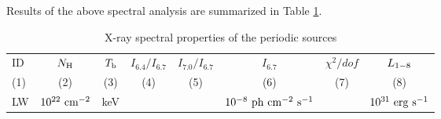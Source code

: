 \documentclass[fleqn,usenatbib]{mnras}
\begin{document}
Results of the above spectral analysis are summarized in Table \ref{tab:spec}.
\begin{table}
\centering
\begin{threeparttable}
\caption{X-ray spectral properties of the periodic sources \label{tab:spec}}
\begin{spacing}{1.19}

\begin{tabular}{lccccccc}
\hline
\hline
ID & $N_{\rm H}$ & $T_{\rm b}$ & $I_{6.4}/I_{6.7}$ &
$I_{7.0}/I_{6.7}$ &  $I_{6.7}$ & $\chi^2/dof$ & $L_{\rm 1-8}$ 
\\
(1) & (2) & (3) & (4) & (5) & (6) & (7) & (8)
\\
LW & $10^{22}\rm~cm^{-2}$ & keV & & & $10^{-8}\rm~ph~cm^{-2}~s^{-1}$ & & $10^{31}\rm~erg~s^{-1}$ 
\\
\hline


\end{tabular}
\end{spacing}
\end{threeparttable}
\end{table}
\end{document}
